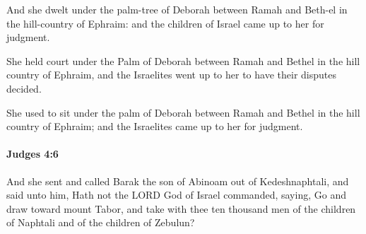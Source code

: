 			\begin{versebox}
					\item[BHS] 
					\item[ASV] And she dwelt under the palm-tree of Deborah between Ramah and Beth-el in the hill-country of Ephraim: and the children of Israel came up to her for judgment.
					\item[NIV] She held court under the Palm of Deborah between Ramah and Bethel in the hill country of Ephraim, and the Israelites went up to her to have their disputes decided.
					\item[NRSV] She used to sit under the palm of Deborah between Ramah and Bethel in the hill country of Ephraim; and the Israelites came up to her for judgment.
			\end{versebox}

		\paragraph{Judges 4:6} %
			\label{JUDGES-4-6}

			And she sent and called Barak the son of Abinoam out of Kedeshnaphtali, and said unto him, Hath not the LORD God of Israel commanded, saying, Go and draw toward mount Tabor, and take with thee ten thousand men of the children of Naphtali and of the children of Zebulun?

